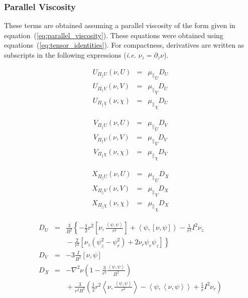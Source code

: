 \documentclass[letterpaper]{book}
\newcommand{\tensor}[1]{\mathsf{#1}}
\renewcommand{\P}{\tensor{\Pi}}
\newcommand{\lp}[1]{\nabla^2 #1}
\newcommand{\pb}[2]{\left[#1,#2\right]}
\newcommand{\ip}[2]{\left\langle  #1,#2\right\rangle}
\begin{document}
\subsubsection{Parallel Viscosity}

These terms are obtained assuming a parallel viscosity of the form
given in equation~(\ref{eq:parallel_viscosity}).  These equations were
obtained using equations~(\ref{eq:tensor_identities}).  For
compactness, derivatives are written as subscripts in the following
expressions (\textit{i.e.} $\nu_z = \partial_z \nu$).

\begin{equation}
  \begin{array}{lcl}
    U_{\P_\parallel U}(\nu, U) & = & {\mu_\parallel}_U D_U
    \\
    U_{\P_\parallel V}(\nu, V) & = & {\mu_\parallel}_V D_U
    \\
    U_{\P_\parallel \chi}(\nu, \chi) & = & {\mu_\parallel}_\chi D_U
  \end{array}
\end{equation}

\begin{equation}
  \begin{array}{lcl}
    V_{\P_\parallel U}(\nu, U) & = & {\mu_\parallel}_U D_V
    \\
    V_{\P_\parallel V}(\nu, V) & = & {\mu_\parallel}_V D_V
    \\
    V_{\P_\parallel \chi}(\nu, \chi) & = & {\mu_\parallel}_\chi D_V
  \end{array}
\end{equation}

\begin{equation}
  \begin{array}{lcl}
    X_{\P_\parallel U}(\nu, U) & = & {\mu_\parallel}_U D_X
    \\
    X_{\P_\parallel V}(\nu, V) & = & {\mu_\parallel}_V D_X
    \\
    X_{\P_\parallel \chi}(\nu, \chi) & = & {\mu_\parallel}_\chi D_X
  \end{array}
\end{equation}

\begin{eqnarray*}
  D_U & = & \frac{3}{B^2} \left\{ 
  - \frac{1}{2}r^2\pb{\nu}{\frac{\ip{\psi}{\psi}}{r^2}}
  + \ip{\psi}{\pb{\nu}{\psi}} 
  - \frac{1}{r^2} I^2 \nu_z 
  \right.\\ && \left. \mbox{}
  - \frac{2}{r^2}\left[ \nu_z (\psi_z^2 - \psi_r^2) + 2\nu_r \psi_r \psi_z
    \right]
  \right\}
  \\
  D_V & = & - 3 \frac{I}{B^2} \pb{\nu}{\psi}
  \\
  D_X & = & - \lp{\nu} 
  \left(1 - \frac{3}{r^2}\frac{\ip{\psi}{\psi}}{B^2} \right)
  \\ &&  \mbox{}
  + \frac{3}{r^2 B^2} \left(
    \frac{1}{2}r^2\ip{\nu}{\frac{\ip{\psi}{\psi}}{r^2}}
    - \ip{\psi}{\ip{\nu}{\psi}} 
    + \frac{1}{r} I^2 \nu_r \right)
\end{eqnarray*}
\end{document}
